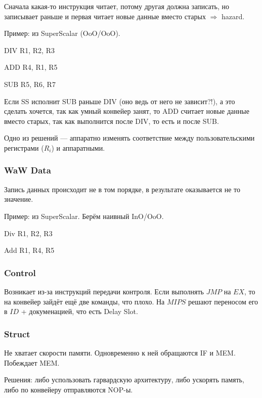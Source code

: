\documentclass[12pt, a4paper]{article}
\begin{document}
Сначала какая-то инструкция читает, потому другая должна записать, но записывает раньше и первая читает новые данные вместо старых $\Rightarrow$ hazard.

Пример: из SuperScalar (OoO/OoO).

DIV R1, R2, R3

ADD R4, R1, R5

SUB R5, R6, R7

Если SS исполнит SUB раньше DIV (оно ведь от него не зависит?!), а это сделать хочется, так как умный конвейер занят,
то ADD считает новые данные вместо старых, так как выполнится после DIV, то есть и после SUB.

Одно из решений — аппаратно изменять соответствие между пользовательскими регистрами ($R_i$) 
и аппаратными.


\subsubsection{WaW Data}

Запись данных происходит не в том порядке, в результате оказывается не то значение.

Пример: из SuperScalar.
Берём наивный InO/OoO.

Div R1, R2, R3

Add R1, R4, R5



\subsubsection{Control}

Возникает из-за инструкций передачи контроля.
Если выполнять $JMP$ на $EX$, то на конвейер зайдёт ещё две команды, что плохо.
На $MIPS$ решают переносом его в $ID$ + докуменацией, что есть Delay Slot.


\subsubsection{Struct}

Не хватает скорости памяти. Одновременно к ней обращаются IF и MEM.
Побеждает MEM. 

Решения: либо успользовать гарвардскую архитектуру, либо ускорять память, либо по конвейеру отправляются NOP-ы.
\end{document}
